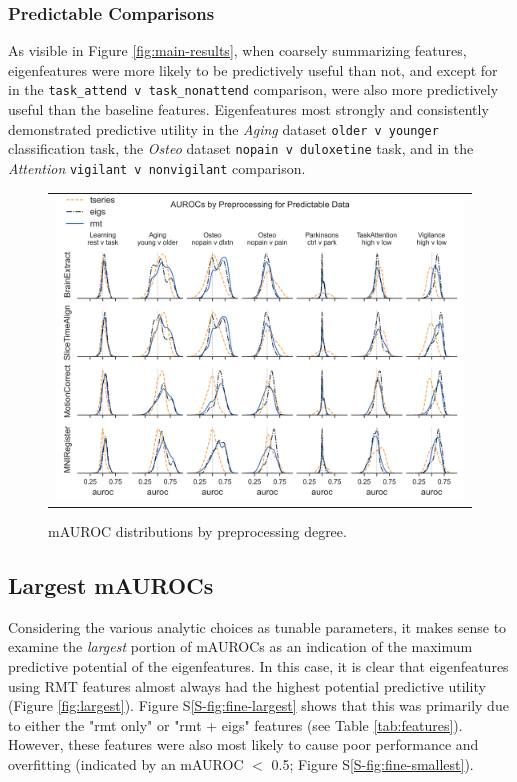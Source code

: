\documentclass[12pt]{spieman}  %
\newcommand{\code}[1]{\small\texttt{#1}\normalsize}
\begin{document}
\begin{spacing}{2}
\subsubsection{Predictable Comparisons}
As visible in Figure \ref{fig:main-results}, when coarsely summarizing
features, eigenfeatures were more likely to be predictively useful than not,
and except for in the \code{task\_attend v task\_nonattend} comparison, were
also more predictively useful than the baseline features.  Eigenfeatures most
strongly and consistently demonstrated predictive utility in the \textit{Aging}
dataset \code{older v younger} classification task, the \textit{Osteo} dataset
\code{nopain v duloxetine} task, and in the \textit{Attention} \code{vigilant v
nonvigilant} comparison.



\begin{figure}
\begin{center}
\begin{tabular}{c}
\includegraphics[width=6.5in]{coarse_feature_by_preproc_predictive_subgroup.png}
\end{tabular}
\end{center}
\caption
{ \label{fig:preproc} mAUROC distributions by preprocessing degree.}
\end{figure}

\subsection{Largest mAUROCs}
Considering the various analytic choices as tunable parameters, it makes sense
to examine the \textit{largest} portion of mAUROCs as an indication of the
maximum predictive potential of the eigenfeatures. In this case, it is clear
that eigenfeatures using RMT features almost always had the highest potential
predictive utility (Figure \ref{fig:largest}). Figure S\ref{S-fig:fine-largest}
shows that this was primarily due to either the "rmt only" or "rmt + eigs"
features (see Table \ref{tab:features}). However, these features were also most
likely to cause poor performance and overfitting (indicated by an mAUROC \(<\)
0.5; Figure S\ref{S-fig:fine-smallest}).


\end{spacing}
\end{document}
